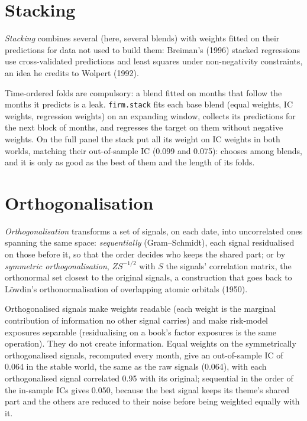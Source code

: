 \section{Stacking}

\begin{definition}[Stacking]\label{def:rs:signal-combination:stacking}
\emph{Stacking} combines several  (here, several blends) with weights fitted on their predictions for data not used to
build them: Breiman's (1996) stacked regressions use cross-validated predictions and least squares under non-negativity constraints, an idea
he credits to Wolpert (1992).
\end{definition}

Time-ordered folds are compulsory: a blend fitted on months that follow the months it predicts is a leak. \texttt{firm.stack} fits each base
blend (equal weights, IC weights, regression weights) on an expanding window, collects its predictions for the next block of months, and
regresses the target on them without negative weights. On the full panel the stack put all its weight on IC weights in both worlds, matching
their out-of-sample IC (0.099 and 0.075):  chooses among blends, and it is only as good as the best of them and the length of its
folds.

\section{Orthogonalisation}

\begin{definition}\label{def:rs:signal-combination:orth}
\emph{Orthogonalisation} transforms a set of signals, on each date, into uncorrelated ones spanning the same space:
\emph{sequentially} (Gram--Schmidt), each signal residualised on those before it, so that the order decides who keeps the shared part; or
by \emph{symmetric orthogonalisation}, $Z S^{-1/2}$ with $S$ the signals' correlation matrix, the orthonormal set
closest to the original signals, a construction that goes back to Löwdin's orthonormalisation of overlapping atomic orbitals (1950).
\end{definition}

Orthogonalised signals make weights readable (each weight is the marginal contribution of information no other signal carries) and make
risk-model exposures separable (residualising on a book's factor exposures is the same operation). They do not create information. Equal
weights on the symmetrically orthogonalised signals, recomputed every month, give an out-of-sample IC of 0.064 in the stable world, the same as
the raw signals (0.064), with each orthogonalised signal correlated 0.95 with its original; sequential  in the order of the
in-sample ICs gives 0.050, because the best signal keeps its theme's shared part and the others are reduced to their noise before being
weighted equally with it.

